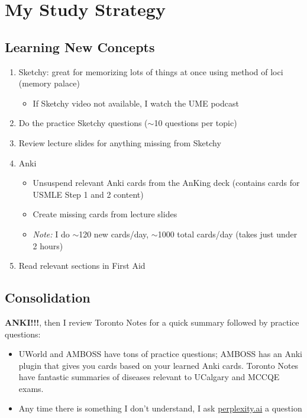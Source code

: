\documentclass{article}
\begin{document}
\section{My Study Strategy}

\subsection{Learning New Concepts}

\begin{enumerate}
    \item Sketchy: great for memorizing lots of things at once using method of loci (memory palace)
    \begin{itemize}
        \item If Sketchy video not available, I watch the UME podcast
    \end{itemize}
    \item Do the practice Sketchy questions ($\sim$10 questions per topic)
    \item Review lecture slides for anything missing from Sketchy
    \item Anki
    \begin{itemize}
        \item Unsuspend relevant Anki cards from the AnKing deck (contains cards for USMLE Step 1 and 2 content)
        \item Create missing cards from lecture slides
        \item \textit{Note:} I do $\sim$120 new cards/day, $\sim$1000 total cards/day (takes just under 2 hours)
    \end{itemize}
    \item Read relevant sections in First Aid
\end{enumerate}

\subsection{Consolidation}

\textbf{ANKI!!!}, then I review Toronto Notes for a quick summary followed by practice questions:
\begin{itemize}
    \item UWorld and AMBOSS have tons of practice questions; AMBOSS has an Anki plugin that gives you cards based on your learned Anki cards. Toronto Notes have fantastic summaries of diseases relevant to UCalgary and MCCQE exams.
    \item Any time there is something I don’t understand, I ask \href{https://www.perplexity.ai/}{perplexity.ai} a question
\end{itemize}
\end{document}
